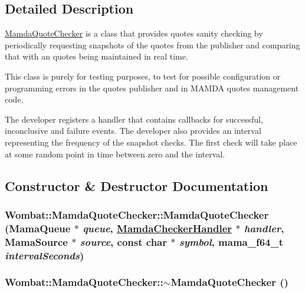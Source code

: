 \subsection{Detailed Description}
\hyperlink{classWombat_1_1MamdaQuoteChecker}{Mamda\-Quote\-Checker} is a class that provides quotes sanity checking by periodically requesting snapshots of the quotes from the publisher and comparing that with an quotes being maintained in real time. 

This class is purely for testing purposes, to test for possible configuration or programming errors in the quotes publisher and in MAMDA quotes management code.

The developer registers a handler that contains callbacks for successful, inconclusive and failure events. The developer also provides an interval representing the frequency of the snapshot checks. The first check will take place at some random point in time between zero and the interval. 



\subsection{Constructor \& Destructor Documentation}
\hypertarget{classWombat_1_1MamdaQuoteChecker_0ca2d9c04378c17e85e681d594b0a3c7}{
\subsubsection[MamdaQuoteChecker]{\setlength{\rightskip}{0pt plus 5cm}Wombat::Mamda\-Quote\-Checker::Mamda\-Quote\-Checker (Mama\-Queue $\ast$ {\em queue}, \hyperlink{classWombat_1_1MamdaCheckerHandler}{Mamda\-Checker\-Handler} $\ast$ {\em handler}, Mama\-Source $\ast$ {\em source}, const char $\ast$ {\em symbol}, mama\_\-f64\_\-t {\em interval\-Seconds})}}
\label{classWombat_1_1MamdaQuoteChecker_0ca2d9c04378c17e85e681d594b0a3c7}


\hypertarget{classWombat_1_1MamdaQuoteChecker_13019a47a0962b84ae5475b9bc1dfdf1}{
\subsubsection[$\sim$MamdaQuoteChecker]{\setlength{\rightskip}{0pt plus 5cm}Wombat::Mamda\-Quote\-Checker::$\sim$Mamda\-Quote\-Checker ()}}
\label{classWombat_1_1MamdaQuoteChecker_13019a47a0962b84ae5475b9bc1dfdf1}


